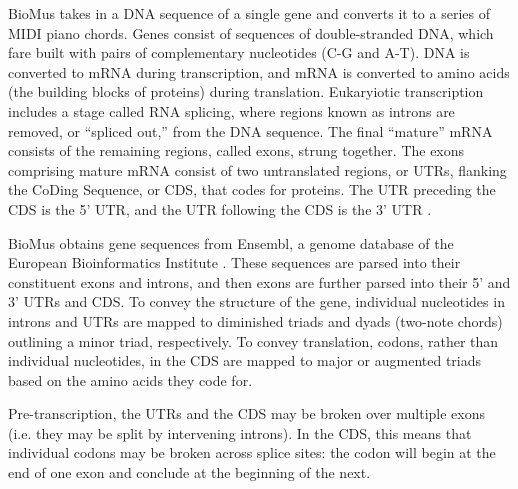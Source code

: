 \documentclass[letterpaper]{article}
\begin{document}
BioMus takes in a DNA sequence of a single gene and converts it to a series of MIDI piano chords. Genes consist of sequences of double-stranded DNA, which fare built with pairs of complementary nucleotides (C-G and A-T). 
DNA is converted to mRNA during transcription, and mRNA is converted to amino acids (the building blocks of proteins) during translation. Eukaryiotic transcription includes a stage called RNA splicing, where regions known as introns are removed, or “spliced out,” from the DNA sequence. The final “mature” mRNA consists of the remaining regions, called exons, strung together. The exons comprising mature mRNA consist of two untranslated regions, or UTRs, flanking the CoDing Sequence, or CDS, that codes for proteins. 
The UTR preceding the CDS is the 5’ UTR, and the UTR following the CDS is the 3’ UTR \cite{clancy_2008,clancy_brown_2008}.

BioMus obtains gene sequences from Ensembl, a genome database of the European Bioinformatics Institute  \cite{birney_et_al_2004}. These sequences are parsed into their constituent exons and introns, and then exons are further parsed into their 5’ and 3’ UTRs and CDS. To convey the structure of the gene, individual nucleotides in introns and UTRs are mapped to diminished triads and dyads (two-note chords) outlining a minor triad, respectively. To convey translation, codons, rather than individual nucleotides, in the CDS are mapped to major or augmented triads based on the amino acids they code for.

Pre-transcription, the UTRs and the CDS may be broken over multiple exons (i.e. they may be split by intervening introns). In the CDS, this means that individual codons may be broken across splice sites: the codon will begin at the end of one exon and conclude at the beginning of the next.
\end{document}

